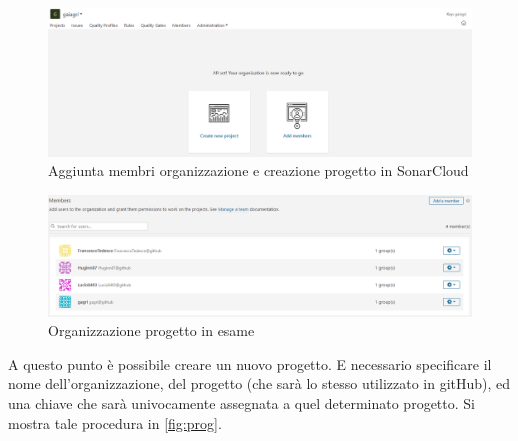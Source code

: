 \begin{figure}[htbp]
	\centering
	\includegraphics[scale=0.3, trim = 0cm 0cm 0cm 0cm, clip=true]{figSonarCloud/aggiuntaMembri.PNG}
	\caption{Aggiunta membri organizzazione e creazione progetto in SonarCloud}
	\label{fig:membri}
\end{figure}

\begin{figure}[htbp]
	\centering
	\includegraphics[scale=0.3, trim = 0cm 0cm 0cm 0cm, clip=true]{figSonarCloud/nostraOrganizzazione.PNG}
	\caption{Organizzazione progetto in esame}
	\label{fig:nostraOrg}
\end{figure}
A questo punto è possibile creare un nuovo progetto. E necessario specificare il nome dell'organizzazione, del progetto (che sarà lo stesso utilizzato in gitHub), ed una chiave che sarà univocamente assegnata a quel determinato progetto. Si mostra tale procedura in \autoref{fig:prog}.


